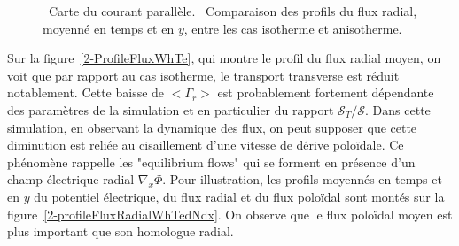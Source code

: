 \begin{refsection}
\begin{figure}[!htbp]
\centering
    \caption{~Carte du courant parallèle.
    ~Comparaison des profils du flux radial, moyenné en temps et en $y$, entre les cas
    isotherme et anisotherme.}
\end{figure}

Sur la figure~\ref{2-ProfileFluxWhTe}, qui montre le profil du flux radial
moyen, on voit que par rapport au cas isotherme, le transport transverse est réduit
notablement. Cette baisse de $<\Gamma_r>$ est probablement fortement
dépendante des paramètres de la simulation et en particulier du rapport
$\mathcal{S}_T/\mathcal{S}$. Dans cette simulation, en observant la dynamique
des flux, on peut supposer que cette diminution est reliée au cisaillement
d'une vitesse de dérive poloïdale.
Ce phénomène rappelle les "equilibrium flows" qui se forment en présence
d'un champ électrique radial $\nabla_x{\Phi}$. Pour illustration, les profils
moyennés en temps et en $y$ du potentiel électrique, du flux radial et du
flux poloïdal sont montés sur la figure~\ref{2-profileFluxRadialWhTedNdx}. On
observe que le flux poloïdal moyen est plus important que son homologue radial.


\end{refsection}
